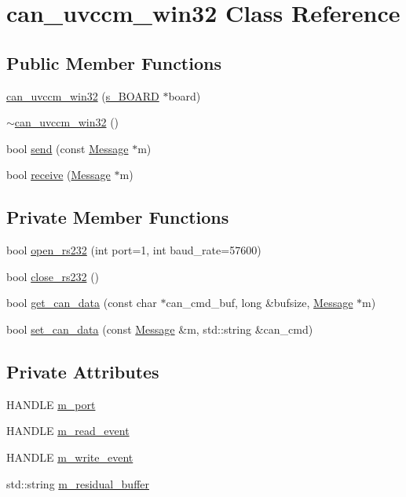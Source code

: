 \hypertarget{classcan__uvccm__win32}{
\section{can\_\-uvccm\_\-win32 Class Reference}
\label{classcan__uvccm__win32}
}
\subsection*{Public Member Functions}
\begin{CompactItemize}
\item 
\hyperlink{classcan__uvccm__win32_f4f6d1f25174fd3b7d897a5f73bc363e}{can\_\-uvccm\_\-win32} (\hyperlink{structstruct__s__BOARD}{s\_\-BOARD} $\ast$board)
\item 
\hyperlink{classcan__uvccm__win32_39bb5c7bb141391d0f2f34b7dd5f487c}{$\sim$can\_\-uvccm\_\-win32} ()
\item 
bool \hyperlink{classcan__uvccm__win32_3358bfa32c0164bc11d220745e3e0430}{send} (const \hyperlink{structMessage}{Message} $\ast$m)
\item 
bool \hyperlink{classcan__uvccm__win32_4301393c1d3046b35d0b545e761b94db}{receive} (\hyperlink{structMessage}{Message} $\ast$m)
\end{CompactItemize}
\subsection*{Private Member Functions}
\begin{CompactItemize}
\item 
bool \hyperlink{classcan__uvccm__win32_7fb6732edc691451bc1d3206c07d4715}{open\_\-rs232} (int port=1, int baud\_\-rate=57600)
\item 
bool \hyperlink{classcan__uvccm__win32_06f9d2fb860a821436471c3233f91dff}{close\_\-rs232} ()
\item 
bool \hyperlink{classcan__uvccm__win32_c3d1d02a46518b2639beb6060f79f2a2}{get\_\-can\_\-data} (const char $\ast$can\_\-cmd\_\-buf, long \&bufsize, \hyperlink{structMessage}{Message} $\ast$m)
\item 
bool \hyperlink{classcan__uvccm__win32_0f2aed9c45f29e6082f37ea17aea46ae}{set\_\-can\_\-data} (const \hyperlink{structMessage}{Message} \&m, std::string \&can\_\-cmd)
\end{CompactItemize}
\subsection*{Private Attributes}
\begin{CompactItemize}
\item 
HANDLE \hyperlink{classcan__uvccm__win32_3f13c1748b3cd57fd1d478782428859a}{m\_\-port}
\item 
HANDLE \hyperlink{classcan__uvccm__win32_cf25e6725871137696ab41b06fa05417}{m\_\-read\_\-event}
\item 
HANDLE \hyperlink{classcan__uvccm__win32_544ea7fd0e8a5d7cfb7cf9058d6020a4}{m\_\-write\_\-event}
\item 
std::string \hyperlink{classcan__uvccm__win32_d264855657adc02fbc687f37d302fc9f}{m\_\-residual\_\-buffer}
\end{CompactItemize}
